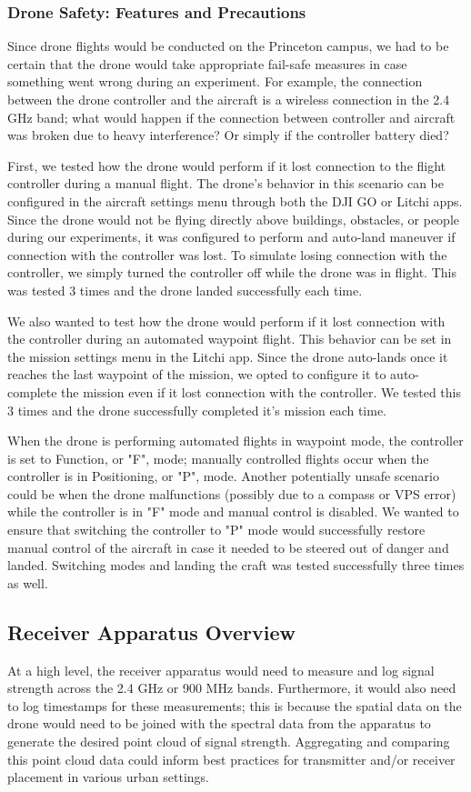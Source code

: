 \documentclass[pageno]{jpaper}
\begin{document}
\subsubsection{Drone Safety: Features and Precautions}
Since drone flights would be conducted on the Princeton campus, we had to be certain that the drone would take appropriate fail-safe measures in case something went wrong during an experiment. For example, the connection between the drone controller and the aircraft is a wireless connection in the 2.4 GHz band; what would happen if the connection between controller and aircraft was broken due to heavy interference? Or simply if the controller battery died?

First, we tested how the drone would perform if it lost connection to the flight controller during a manual flight. The drone's behavior in this scenario can be configured in the aircraft settings menu through both the DJI GO or Litchi apps. Since the drone would not be flying directly above buildings, obstacles, or people during our experiments, it was configured to perform and auto-land maneuver if connection with the controller was lost. To simulate losing connection with the controller, we simply turned the controller off while the drone was in flight. This was tested 3 times and the drone landed successfully each time. 

We also wanted to test how the drone would perform if it lost connection with the controller during an automated waypoint flight. This behavior can be set in the mission settings menu in the Litchi app. Since the drone auto-lands once it reaches the last waypoint of the mission, we opted to configure it to auto-complete the mission even if it lost connection with the controller. We tested this 3 times and the drone successfully completed it's mission each time. 

When the drone is performing automated flights in waypoint mode, the controller is set to Function, or "F", mode; manually controlled flights occur when the controller is in Positioning, or "P", mode. Another potentially unsafe scenario could be when the drone malfunctions (possibly due to a compass or VPS error) while the controller is in "F" mode and manual control is disabled. We wanted to ensure that switching the controller to "P" mode would successfully restore manual control of the aircraft in case it needed to be steered out of danger and landed. Switching modes and landing the craft was tested successfully three times as well.

\subsection{Receiver Apparatus Overview}
At a high level, the receiver apparatus would need to measure and log signal strength across the 2.4 GHz or 900 MHz bands. Furthermore, it would also need to log timestamps for these measurements; this is because the spatial data on the drone would need to be joined with the spectral data from the apparatus to generate the desired point cloud of signal strength. Aggregating and comparing this point cloud data could inform best practices for transmitter and/or receiver placement in various urban settings.
\end{document}
